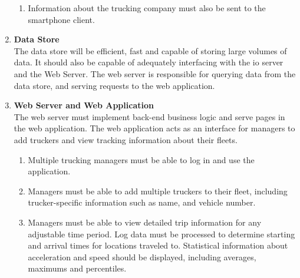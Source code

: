 \begin{enumerate}
\begin{enumerate}
        \item Information about the trucking company must also be sent to the smartphone client.
    \end{enumerate}
\item \textbf{Data Store}\\
The data store will be efficient, fast and capable of storing large volumes of data.
It should also be capable of adequately interfacing with the \ac{io} server and the Web Server.
The web server is responsible for querying data from the data store, and serving requests to the web application.
\item \textbf{Web Server and Web Application}\\
The web server must implement back-end business logic and serve pages in the web application.
The web application acts as an interface for managers to add truckers and view tracking information about their fleets.
    \begin{enumerate}
        \item Multiple trucking managers must be able to log in and use the application.
        \item Managers must be able to add multiple truckers to their fleet, including trucker-specific information such as name, and vehicle number.
        \item Managers must be able to view detailed trip information for any adjustable time period. Log data must be processed to determine starting and arrival times for locations traveled to. Statistical information about acceleration and speed should be displayed, including averages, maximums and percentiles.
    \end{enumerate}
\end{enumerate}
